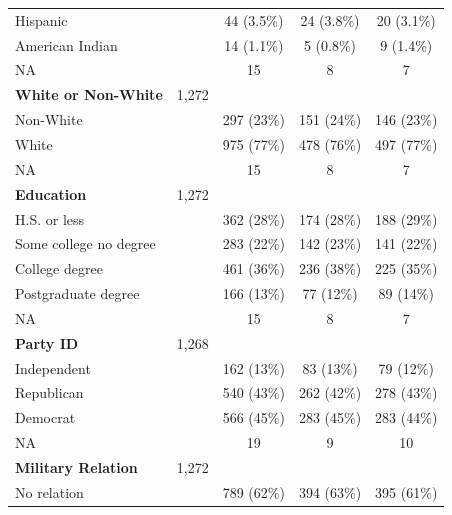 \documentclass[
  12pt,
  letterpaper,
]{article}
\begin{document}
\begin{table}[H]
{\begin{tabular}{lcccc}
\addlinespace
\hspace{1em}Hispanic &  & 44 (3.5\%) & 24 (3.8\%) & 20 (3.1\%)\\
\hspace{1em}American Indian &  & 14 (1.1\%) & 5 (0.8\%) & 9 (1.4\%)\\
\hspace{1em}NA &  & 15 & 8 & \vphantom{3} 7\\
\textbf{White or Non-White} & 1,272 &  &  & \\
\hspace{1em}Non-White &  & 297 (23\%) & 151 (24\%) & 146 (23\%)\\
\addlinespace
\hspace{1em}White &  & 975 (77\%) & 478 (76\%) & 497 (77\%)\\
\hspace{1em}NA &  & 15 & 8 & \vphantom{2} 7\\
\textbf{Education} & 1,272 &  &  & \\
\hspace{1em}H.S. or less &  & 362 (28\%) & 174 (28\%) & 188 (29\%)\\
\hspace{1em}Some college no degree &  & 283 (22\%) & 142 (23\%) & 141 (22\%)\\
\addlinespace
\hspace{1em}College degree &  & 461 (36\%) & 236 (38\%) & 225 (35\%)\\
\hspace{1em}Postgraduate degree &  & 166 (13\%) & 77 (12\%) & 89 (14\%)\\
\hspace{1em}NA &  & 15 & 8 & \vphantom{1} 7\\
\textbf{Party ID} & 1,268 &  &  & \\
\hspace{1em}Independent &  & 162 (13\%) & 83 (13\%) & 79 (12\%)\\
\addlinespace
\hspace{1em}Republican &  & 540 (43\%) & 262 (42\%) & 278 (43\%)\\
\hspace{1em}Democrat &  & 566 (45\%) & 283 (45\%) & 283 (44\%)\\
\hspace{1em}NA &  & 19 & 9 & 10\\
\textbf{Military Relation} & 1,272 &  &  & \\
\hspace{1em}No relation &  & 789 (62\%) & 394 (63\%) & 395 (61\%)\\

\end{tabular}}
\end{table}
\end{document}
